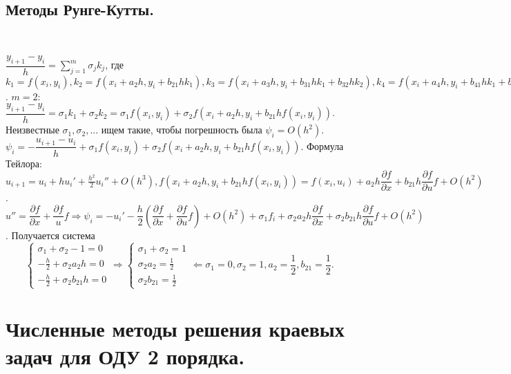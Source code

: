 \documentclass[9pt]{article}
\begin{document}
\subsection{Методы Рунге-Кутты.}

\ 
\par\(\dfrac{y_{i+1}-y_i}{h}=\sum_{j=1}^m\sigma_jk_j\), где \(k_1=f(x_i,y_i),k_2=f(x_i+a_2h,y_i+b_{21}hk_1),k_3=f(x_i+a_3h,y_i+b_{31}hk_1+b_{32}hk_2),k_4=f(x_i+a_4h,y_i+b_{41}hk_1+b_{42}hk_2+b_{43}hk_3)\).
\parПри \(m=2\): \(\dfrac{y_{i+1}-y_i}{h}=\sigma_1k_1+\sigma_2k_2=\sigma_1f(x_i,y_i)+\sigma_2f(x_i+a_2h,y_i+b_{21}hf(x_i,y_i))\). Неизвестные \(\sigma_1,\sigma_2,...\) ищем такие, чтобы погрешность была \(\psi_i=O(h^2)\). \(\psi_i=-\dfrac{u_{i+1}-u_i}{h}+\sigma_1f(x_i,y_i)+\sigma_2f(x_i+a_2h,y_i+b_{21}hf(x_i,y_i))\). Формула Тейлора: \(u_{i+1}=u_i+hu_i'+\frac{h^2}{2}u_i''+O(h^3),f(x_i+a_2h,y_i+b_{21}hf(x_i,y_i))=f(x_i,u_i)+a_2h\dfrac{\partial f}{\partial x}+b_{21}h\dfrac{\partial f}{\partial u}f+O(h^2)\). \(u''=\dfrac{\partial f}{\partial x}+\dfrac{\partial f}{u}f\Rightarrow \psi_i=-u_i'-\dfrac{h}{2}(\dfrac{\partial f}{\partial x}+\dfrac{\partial f}{\partial u}f)+O(h^2)+\sigma_1f_i+\sigma_2a_2h\dfrac{\partial f}{\partial x}+\sigma_2b_{21}h\dfrac{\partial f}{\partial u}f+O(h^2)\). Получается система
\[\left\{\begin{array}{l}
    \sigma_1+\sigma_2-1=0 \\
    -\frac{h}{2}+\sigma_2a_2h=0 \\
    -\frac{h}{2}+\sigma_2b_{21}h=0
\end{array}\right.\Rightarrow
\left\{\begin{array}{l}
    \sigma_1+\sigma_2=1 \\
    \sigma_2a_2=\frac{1}{2} \\
    \sigma_2b_{21}=\frac{1}{2}
\end{array}\right.\Leftarrow \sigma_1=0,\sigma_2=1,a_2=\frac{1}{2},b_{21}=\frac{1}{2}.\]

\section{Численные методы решения краевых задач для ОДУ 2 порядка.}
\end{document}
